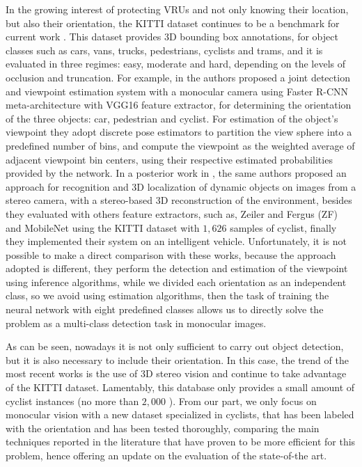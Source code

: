\documentclass[journal]{IEEEtran}
\begin{document}
In the growing interest of protecting VRUs and not only knowing their location, but also their orientation, the KITTI dataset continues to be a benchmark for current work \cite{chen20153d,guindel2017modeling,guindel2019traffic}. This dataset provides 3D bounding box annotations, for object classes such as cars, vans, trucks, pedestrians, cyclists and trams, and it is evaluated in three regimes: easy, moderate and hard, depending on the levels of occlusion and truncation. For example, in \cite{guindel2018fast} the authors proposed a joint detection and viewpoint estimation system with a monocular camera using Faster R-CNN meta-architecture with VGG16 feature extractor, for determining the orientation of the three objects: car, pedestrian and cyclist. For estimation of the object's viewpoint they adopt discrete pose estimators to partition the view sphere into a predefined number of bins, and compute the viewpoint as the weighted average of adjacent viewpoint bin centers, using their respective estimated probabilities provided by the network. In a posterior work in \cite{guindel2019traffic}, the same authors proposed an approach for recognition and 3D localization of dynamic objects on images from a stereo camera, with a stereo-based 3D reconstruction of the environment, besides they evaluated with others feature extractors, such as, Zeiler and Fergus (ZF) and MobileNet using the KITTI dataset with $1,626$ samples of cyclist, finally they implemented their system on an intelligent vehicle. Unfortunately, it is not possible to make a direct comparison with these works, because the approach adopted is different, they perform the detection and estimation of the viewpoint using inference algorithms, while we divided each orientation as an independent class, so we avoid using estimation algorithms, then the task of training the neural network with eight predefined classes allows us to directly solve the problem as a multi-class detection task in monocular images.

As can be seen, nowadays it is not only sufficient to carry out object detection, but it is also necessary to include their orientation. In this case, the trend of the most recent works is the use of 3D stereo vision and continue to take advantage of the KITTI dataset. Lamentably, this database only provides a small amount of cyclist instances (no more than $2,000$ \cite{BenchmarkCylistDetect2016,guindel2019traffic}). From our part, we only focus on monocular vision with a new dataset specialized in cyclists, that has been labeled with the orientation and has been tested thoroughly, comparing the main techniques reported in the literature that have proven to be more efficient for this problem, hence offering an update on the evaluation of the state-of-the art.
\end{document}
